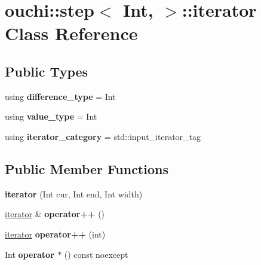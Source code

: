 \hypertarget{classouchi_1_1step_1_1iterator}{}\section{ouchi\+::step$<$ Int, $>$\+::iterator Class Reference}
\label{classouchi_1_1step_1_1iterator}
\subsection*{Public Types}
\begin{DoxyCompactItemize}
\item 
\mbox{\label{classouchi_1_1step_1_1iterator_acc8eb7f549acbc6da79ea126eea9400e}} 
using {\bfseries difference\+\_\+type} = Int
\item 
\mbox{\label{classouchi_1_1step_1_1iterator_a403e46b874275c38eee2ae51e5415162}} 
using {\bfseries value\+\_\+type} = Int
\item 
\mbox{\label{classouchi_1_1step_1_1iterator_a07fd460bdf58f96a5b54dfd1def5783f}} 
using {\bfseries iterator\+\_\+category} = std\+::input\+\_\+iterator\+\_\+tag
\end{DoxyCompactItemize}
\subsection*{Public Member Functions}
\begin{DoxyCompactItemize}
\item 
\mbox{\label{classouchi_1_1step_1_1iterator_ae7afb6ec2d02efa13e2d7128ed26be70}} 
{\bfseries iterator} (Int cur, Int end, Int width)
\item 
\mbox{\label{classouchi_1_1step_1_1iterator_a7c2927f4984ed3dbc5dd60c16d084cc8}} 
\mbox{\hyperlink{classouchi_1_1step_1_1iterator}{iterator}} \& {\bfseries operator++} ()
\item 
\mbox{\label{classouchi_1_1step_1_1iterator_a7f8dd94f52a63993a80ded7ada8859aa}} 
\mbox{\hyperlink{classouchi_1_1step_1_1iterator}{iterator}} {\bfseries operator++} (int)
\item 
\mbox{\label{classouchi_1_1step_1_1iterator_ae6ba2bf309461f7c94acece2199b6c30}} 
Int {\bfseries operator $\ast$} () const noexcept
\end{DoxyCompactItemize}
